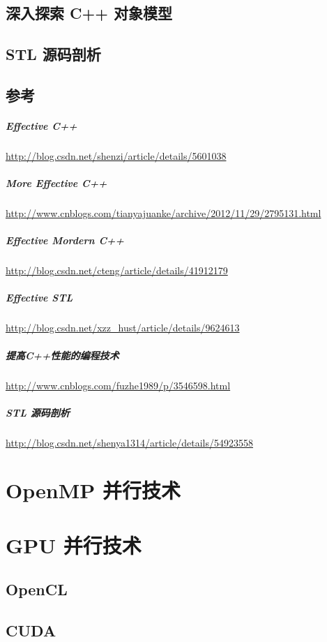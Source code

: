 \documentclass[UTF8,a4paper,12pt]{ctexbook}
\begin{document}
	\section{深入探索 C++ 对象模型}
	
	\section{STL 源码剖析}
	
	\section{参考}
		\paragraph{Effective C++} \url{http://blog.csdn.net/shenzi/article/details/5601038}
		
		\paragraph{More Effective C++} \url{http://www.cnblogs.com/tianyajuanke/archive/2012/11/29/2795131.html}
		
		\paragraph{Effective Mordern C++} \url{http://blog.csdn.net/cteng/article/details/41912179}
		
		\paragraph{Effective STL} \url{http://blog.csdn.net/xzz_hust/article/details/9624613}
		
		\paragraph{提高C++性能的编程技术} \url{http://www.cnblogs.com/fuzhe1989/p/3546598.html}
		
		\paragraph{STL 源码剖析} \url{http://blog.csdn.net/shenya1314/article/details/54923558}
\chapter{OpenMP 并行技术}


\chapter{GPU 并行技术}
	\section{OpenCL}
	
	\section{CUDA}
\end{document}
